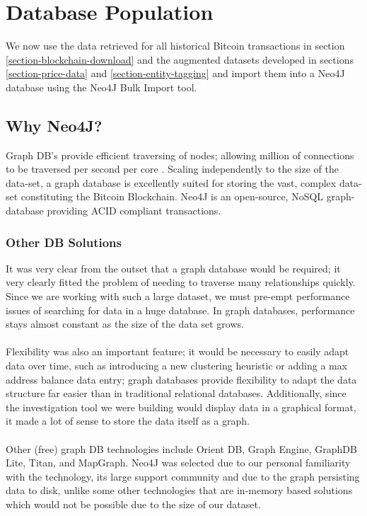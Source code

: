 \chapter{Database Population}\label{section-blockchain-import}
We now use the data retrieved for all historical Bitcoin transactions in section \ref{section-blockchain-download} and the augmented datasets developed in sections \ref{section-price-data} and \ref{section-entity-tagging} and import them into a Neo4J database using the Neo4J Bulk Import tool.

\section{Why Neo4J?}
Graph DB's provide efficient traversing of nodes; allowing million of connections to be traversed per second per core \cite{RefWorks:doc:5c98f0c6e4b00cbb4da393d8}. Scaling independently to the size of the data-set, a graph database is excellently suited for storing the vast, complex data-set constituting the Bitcoin Blockchain. Neo4J is an open-source, NoSQL graph-database providing ACID compliant transactions.

\subsection{Other DB Solutions}
It was very clear from the outset that a graph database would be required; it very clearly fitted the problem of needing to traverse many relationships quickly. Since we are working with such a large dataset, we must pre-empt performance issues of searching for data in a huge database. In graph databases, performance stays almost constant as the size of the data set grows.
\\\\
Flexibility was also an important feature; it would be necessary to easily adapt data over time, such as introducing a new clustering heuristic or adding a max address balance data entry; graph databases provide flexibility to adapt the data structure far easier than in traditional relational databases. Additionally, since the investigation tool we were building would display data in a graphical format, it made a lot of sense to store the data itself as a graph. 
\\\\
Other (free) graph DB technologies include Orient DB, Graph Engine, GraphDB Lite, Titan, and MapGraph. Neo4J was selected due to our personal familiarity with the technology, its large support community and due to the graph persisting data to disk, unlike some other technologies that are in-memory based solutions which would not be possible due to the size of our dataset. 

